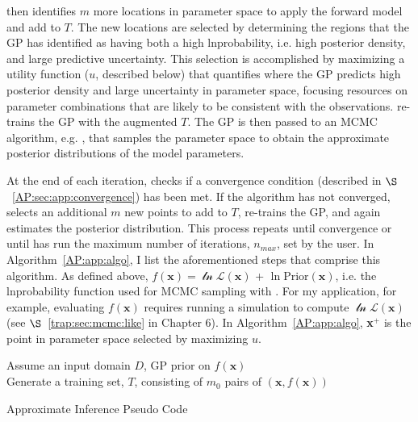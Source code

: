 \approxposterior then identifies $m$ more locations in parameter space to apply the forward model and add to $T$. The new locations are selected by determining the regions that the GP has identified as having both a high lnprobability, i.e. high posterior density, and large predictive uncertainty. This selection is accomplished by maximizing a utility function ($u$, described below) that quantifies where the GP predicts high posterior density and large uncertainty in parameter space, focusing resources on parameter combinations that are likely to be consistent with the observations. \approxposterior re-trains the GP with the augmented $T$. The GP is then passed to an MCMC algorithm, e.g. \emcee, that samples the parameter space to obtain the approximate posterior distributions of the model parameters.

At the end of each iteration, \approxposterior checks if a convergence condition (described in $\S$~\ref{AP:sec:app:convergence}) has been met. If the algorithm has not converged, \approxposterior selects an additional $m$ new points to add to $T$, re-trains the GP, and again estimates the posterior distribution. This process repeats until convergence or until \approxposterior has run the maximum number of iterations, $n_{max}$, set by the user. In Algorithm~\ref{AP:app:algo}, I list the aforementioned steps that comprise this algorithm. As defined above, $f(\textbf{x}) = \mathcal{\ln L}(\textbf{x})$ + $\ln \mathrm{Prior}(\textbf{x})$, i.e. the lnprobability function used for MCMC sampling with \emcee. For my application, for example, evaluating $f(\textbf{x})$ requires running a \vplanet simulation to compute $\mathcal{\ln L}(\textbf{x})$ (see $\S$~\ref{trap:sec:mcmc:like} in Chapter 6).
 In Algorithm~\ref{AP:app:algo}, \textbf{x}$^+$ is the point in parameter space selected by maximizing $u$. 
\begin{algorithm}
\SetAlgoLined
 Assume an input domain $D$, GP prior on $f(\textbf{x})$ \\
 Generate a training set, $T$, consisting of $m_0$ pairs of $(\textbf{x}, f(\textbf{x}))$ \\
\caption{\approxposterior Approximate Inference Pseudo Code \label{AP:app:algo}}
\end{algorithm}
 
